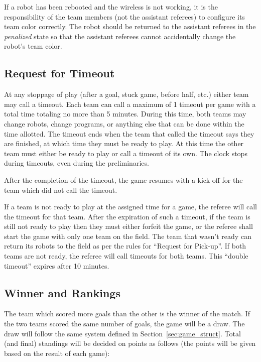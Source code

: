 \documentclass[12pt]{article}
\begin{document}
If a robot has been rebooted and the wireless is not working, it is the responsibility of the team members (not the assistant referees) to configure its team color correctly. The robot should be returned to the assistant referees in the \emph{penalized} state so that the assistant referees cannot accidentally change the robot's team color.

\subsection{Request for Timeout}

At any stoppage of play (after a goal, stuck game, before half, etc.) either team may call a timeout. Each team can call a maximum of 1 timeout per game with a total time totaling no more than 5 minutes. During this time, both teams may change robots, change programs, or anything else that can be done within the time allotted. The timeout ends when the team that called the timeout says they are finished, at which time they must be ready to play. At this time the other team must either be ready to play or call a timeout of its own. The clock stops during timeouts, even during the preliminaries.

After the completion of the timeout, the game resumes with a kick off for the team which did not call the timeout.

If a team is not ready to play at the assigned time for a game, the referee will call the timeout for that team. After the expiration of such a timeout, if the team is still not ready to play then they must either forfeit the game, or the referee shall start the game with only one team on the field.  The team that wasn't ready can return its robots to the field as per the rules for ``Request for Pick-up''. If both teams are not ready, the referee will call timeouts for both teams. This ``double timeout'' expires after 10 minutes.

\subsection{Winner and Rankings}

The team which scored more goals than the other is the winner of the match. If the two teams scored the same number of goals, the game will be a draw. The draw will follow the same system defined in Section~\ref{sec:game_struct}. Total (and final) standings will be decided on points as follows (the points will be given based on the result of each game):
\end{document}
